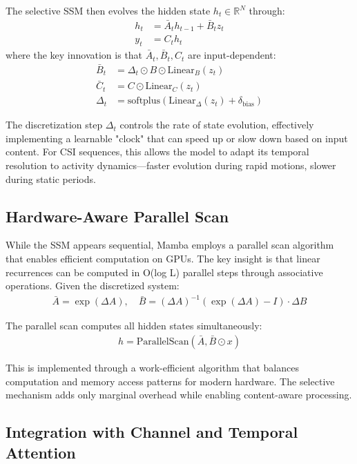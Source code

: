 \documentclass[journal]{IEEEtran}
\begin{document}
The selective SSM then evolves the hidden state $h_t \in \mathbb{R}^N$ through:
\begin{align}
h_t &= \bar{A}_t h_{t-1} + \bar{B}_t z_t \\
y_t &= C_t h_t
\end{align}
where the key innovation is that $\bar{A}_t, \bar{B}_t, C_t$ are input-dependent:
\begin{align}
\bar{B}_t &= \Delta_t \odot B \odot \text{Linear}_B(z_t) \\
\bar{C}_t &= C \odot \text{Linear}_C(z_t) \\
\Delta_t &= \text{softplus}(\text{Linear}_\Delta(z_t) + \delta_{\text{bias}})
\end{align}

The discretization step $\Delta_t$ controls the rate of state evolution, effectively implementing a learnable "clock" that can speed up or slow down based on input content. For CSI sequences, this allows the model to adapt its temporal resolution to activity dynamics—faster evolution during rapid motions, slower during static periods.

\subsection{Hardware-Aware Parallel Scan}

While the SSM appears sequential, Mamba employs a parallel scan algorithm that enables efficient computation on GPUs. The key insight is that linear recurrences can be computed in O(log L) parallel steps through associative operations. Given the discretized system:
\begin{align}
\bar{A} = \exp(\Delta A), \quad \bar{B} = (\Delta A)^{-1}(\exp(\Delta A) - I) \cdot \Delta B
\end{align}

The parallel scan computes all hidden states simultaneously:
\begin{align}
h = \text{ParallelScan}(\bar{A}, \bar{B} \odot x)
\end{align}

This is implemented through a work-efficient algorithm that balances computation and memory access patterns for modern hardware. The selective mechanism adds only marginal overhead while enabling content-aware processing.

\subsection{Integration with Channel and Temporal Attention}
\end{document}
